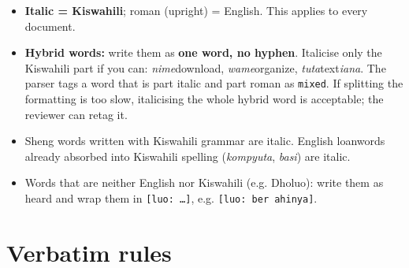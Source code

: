 \documentclass[11pt]{article}
\begin{document}
\begin{itemize}
\tightlist
\item
  \textbf{Italic = Kiswahili}; roman (upright) = English. This applies to every document.
\item
  \textbf{Hybrid words:} write them as \textbf{one word, no hyphen}. Italicise only the Kiswahili part if you can: \emph{nime}download, \emph{wame}organize, \emph{tuta}text\emph{iana}. The parser tags a word that is part italic and part roman as \texttt{mixed}. If splitting the formatting is too slow, italicising the whole hybrid word is acceptable; the reviewer can retag it.
\item
  Sheng words written with Kiswahili grammar are italic. English loanwords already absorbed into Kiswahili spelling (\emph{kompyuta}, \emph{basi}) are italic.
\item
  Words that are neither English nor Kiswahili (e.g. Dholuo): write them as heard and wrap them in \texttt{[luo:\allowbreak{} …]}, e.g. \texttt{[luo:\allowbreak{} ber ahinya]}.
\end{itemize}

\hypertarget{verbatim-rules}{%
\section{Verbatim rules}\label{verbatim-rules}}
\end{document}
